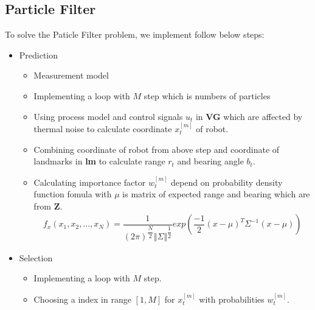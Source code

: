 \documentclass{article}
\begin{document}
\subsection{Particle Filter}
To solve the Paticle Filter problem, we implement follow below steps: \\
\begin{itemize}
	\item{Prediction} 
	\begin{itemize}
		\begin{subequations} 
		Process model:
		\begin{align}
			x_t = x_{t-1} + V_t\Delta{t}\cos\left({\theta_t + \varphi_{t-1}}\right) \\
			y_t = y_{t-1} + V_t\Delta{t}\cos\left({\theta_t + \varphi_{t-1}}\right) \\
			\varphi_t = \varphi_{t-1} + \dfrac{V_t\Delta{t}\sin{\theta_t}}{WB}
		\end{align}
		\end{subequations}
		\begin{subequations}
		Measurement model:
		\begin{align}
			r_t = \sqrt{{\left(x_t - x_L\right)}^2 + {\left(y_t - y_L\right)}^2}\\
			b_t = \arctan{\dfrac{y_t - y_L}{x_t - x_L}} + \varphi_t
		\end{align}
		\end{subequations}
		\item{Measurement model}
		\item{Implementing a loop with $M$ step which is numbers of particles}
		\item{Using process model and control signals $u_t$ in \textbf{VG} which are affected by thermal noise to calculate coordinate $x^{[m]}_t$ of robot.}
		\item{Combining coordinate of robot from above step and coordinate of landmarks in \textbf{lm} to calculate range $r_t$ and bearing angle $b_t$.}
		\item{Calculating importance factor $w^{[m]}_t$ depend on probability density function fomula with $\mu$ is matrix of expected range and bearing which are from \textbf{Z}.}
		\begin{align}
			f_x(x_1,x_2,...,x_N) = \dfrac{1}{\left(2\pi\right)^{\dfrac{N}{2}}\Vert\Sigma\Vert^{\dfrac{1}{2}}}exp\left(\dfrac{-1}{2}\left(x-\mu\right)^T\Sigma^{-1}\left(x-\mu\right)\right)
		\end{align}
	\end{itemize}
	\item{Selection}
	\begin{itemize}
		\item{Implementing a loop with $M$ step.}
		\item{Choosing a index in range $\left[1,M\right]$ for $x^{[m]}_t$ with probabilities $w^{[m]}_t$.}
	\end{itemize}
\end{itemize}
\end{document}
